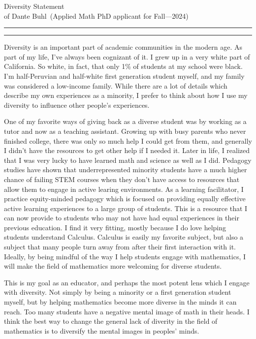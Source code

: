 \documentclass{article}
\newcommand{\soptitle}{Diversity Statement}
\newcommand{\yourname}{Dante Buhl}
\begin{document}
\begin{center}\LARGE\soptitle\\
\large of \yourname\ (Applied Math PhD applicant for Fall---2024)
\end{center}

\hrule
\vspace{1pt}
\hrule height 1pt

\bigskip

\large

Diversity is an important part of academic communities in the modern age. As part of my life, I've always been cognizant of it. I grew up in a very white part of California. So white, in fact, that only 1\% of students at my school were black. I'm half-Peruvian and half-white first generation student myself, and my family was considered a low-income family. While there are a lot of details which describe my own experiences as a minority, I prefer to think about how I use my diversity to influence other people's experiences. 

One of my favorite ways of giving back as a diverse student was by working as a tutor and now as a teaching assistant. Growing up with busy parents who never finished college, there was only so much help I could get from them, and generally I didn't have the resources to get other help if I needed it. Later in life, I realized that I was very lucky to have learned math and science as well as I did. Pedagogy studies have shown that underrepresented minority students have a much higher chance of failing STEM courses when they don't have access to resources that allow them to engage in active learing environments. As a learning facilitator, I practice equity-minded pedagogy which is focused on providing equally effective active learning experiences to a large group of students. This is a resource that I can now provide to students who may not have had equal experiences in their previous education. I find it very fitting, mostly because I do love helping students understand Calculus. Calculus is easily my favorite subject, but also a subject that many people turn away from after their first interaction with it. Ideally, by being mindful of the way I help students engage with mathematics, I will make the field of mathematics more welcoming for diverse students. 

This is my goal as an educator, and perhaps the most potent lens which I engage with diversity. Not simply by being a minority or a first generation student myself, but by helping mathematics become more diverse in the minds it can reach. Too many students have a negative mental image of math in their heads. I think the best way to change the general lack of diverity in the field of mathematics is to diversify the mental images in peoples' minds. 
\end{document}

